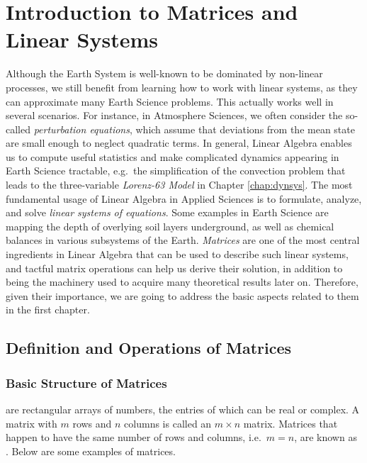 \chapter{Introduction to Matrices and Linear Systems}

Although the Earth System is well-known to be dominated by non-linear processes, we still benefit from learning how to work with linear systems, as they can approximate many Earth Science problems. This actually works well in several scenarios. For instance, in Atmosphere Sciences, we often consider the so-called \textit{perturbation equations}, which assume that deviations from the mean state are small enough to neglect quadratic terms. In general, Linear Algebra enables us to compute useful statistics and make complicated dynamics appearing in Earth Science tractable, e.g.\ the simplification of the convection problem that leads to the three-variable \textit{Lorenz-63 Model} in Chapter \ref{chap:dynsys}. The most fundamental usage of Linear Algebra in Applied Sciences is to formulate, analyze, and solve \textit{linear systems of equations}. Some examples in Earth Science are mapping the depth of overlying soil layers underground, as well as chemical balances in various subsystems of the Earth. \textit{Matrices} are one of the most central ingredients in Linear Algebra that can be used to describe such linear systems, and tactful matrix operations can help us derive their solution, in addition to being the machinery used to acquire many theoretical results later on. Therefore, given their importance, we are going to address the basic aspects related to them in the first chapter.

\section{Definition and Operations of Matrices}
\label{section:matrixdefn}

\subsection{Basic Structure of Matrices}
 are rectangular arrays of numbers, the entries of which can be real or complex. A matrix with $m$ rows and $n$ columns is called an $m \times n$ matrix. Matrices that happen to have the same number of rows and columns, i.e.\ $m = n$, are known as . Below are some examples of matrices.

